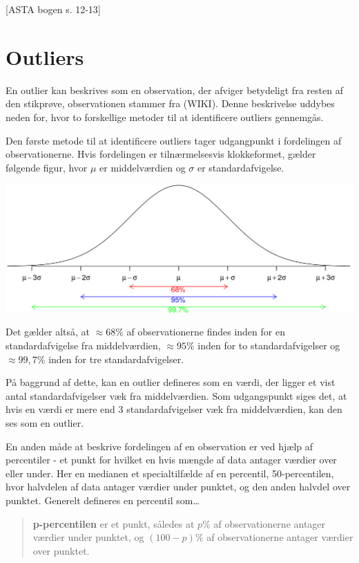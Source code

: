 \documentclass[]{book}
\theoremstyle{definition}
\theoremstyle{definition}
\theoremstyle{definition}
\theoremstyle{remark}
\let\BeginKnitrBlock\begin \let\EndKnitrBlock\end
\begin{document}
{[}ASTA bogen s. 12-13{]}

\hypertarget{outliers}{%
\section{Outliers}\label{outliers}}

En outlier kan beskrives som en observation, der afviger betydeligt fra resten af den stikprøve, observationen stammer fra (WIKI). Denne beskrivelse uddybes neden for, hvor to forskellige metoder til at identificere outliers gennemgås.

Den første metode til at identificere outliers tager udgangpunkt i fordelingen af observationerne. Hvis fordelingen er tilnærmelsesvis klokkeformet, gælder følgende figur, hvor \(\mu\) er middelværdien og \(\sigma\) er standardafvigelse.

\begin{center}\includegraphics[width=0.75\linewidth]{images/Normalfordeling} \end{center}

Det gælder altså, at \(\approx 68 \%\) af observationerne findes inden for en standardafvigelse fra middelværdien, \(\approx 95 \%\) inden for to standardafvigelser og \(\approx 99,7 \%\) inden for tre standardafvigelser.

På baggrund af dette, kan en outlier defineres som en værdi, der ligger et vist antal standardafvigelser væk fra middelværdien. Som udgangspunkt siges det, at hvis en værdi er mere end \(3\) standardafvigelser væk fra middelværdien, kan den ses som en outlier.

En anden måde at beskrive fordelingen af en observation er ved hjælp af percentiler - et punkt for hvilket en hvis mængde af data antager værdier over eller under. Her en medianen et specialtilfælde af en percentil, 50-percentilen, hvor halvdelen af data antager værdier under punktet, og den anden halvdel over punktet. Generelt defineres en percentil som\ldots{}

\begin{quote}
\BeginKnitrBlock{definition}
\protect\hypertarget{def:unnamed-chunk-3}{}{\label{def:unnamed-chunk-3} }\textbf{p-percentilen} er et punkt, således at \(p \%\) af observationerne antager værdier under punktet, og \((100 - p) \%\) af observationerne antager værdier over punktet.
\EndKnitrBlock{definition}
\end{quote}
\end{document}
